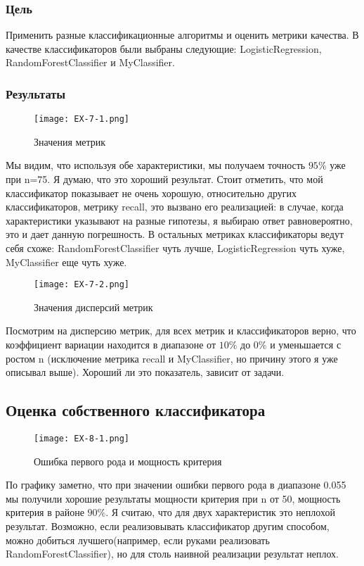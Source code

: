 \documentclass[a4paper, 12pt]{article}
\begin{document}
\subsubsection{Цель}
Применить разные классификационные алгоритмы и оценить метрики качества.
В качестве классификаторов были выбраны следующие: LogisticRegression, RandomForestClassifier и MyClassifier.\\
\subsubsection{Результаты}
\begin{figure}[H]
    \centering
    \texttt{[image: EX-7-1.png]}
    \caption{Значения метрик}
    \label{fig:uml}
\end{figure}
Мы видим, что используя обе характеристики, мы получаем точность $95\%$ уже при n=75. Я думаю, что это хороший результат. Стоит отметить, что мой классификатор показывает не очень хорошую, относительно других классификаторов, метрику recall, это вызвано его реализацией: в случае, когда характеристики указывают на разные гипотезы, я выбираю ответ равновероятно, это и дает данную погрешность. В остальных метриках классификаторы ведут себя схоже: RandomForestClassifier чуть лучше, LogisticRegression чуть хуже, MyClassifier еще чуть хуже.  
\begin{figure}[H]
    \centering
    \texttt{[image: EX-7-2.png]}
    \caption{Значения дисперсий метрик}
    \label{fig:uml}
\end{figure}
Посмотрим на дисперсию метрик, для всех метрик и классификаторов верно, что коэффициент вариации находится в диапазоне от $10\%$ до $0\%$ и уменьшается с ростом n (исключение метрика recall и MyClassifier, но причину этого я уже описывал выше). Хороший ли это показатель, зависит от задачи. 

\subsection{Оценка собственного классификатора}
\begin{figure}[H]
    \centering
    \texttt{[image: EX-8-1.png]}
    \caption{Ошибка первого рода и мощность критерия}
    \label{fig:uml}
\end{figure}

По графику заметно, что при значении ошибки первого рода в диапазоне  0.055 мы получили хорошие результаты мощности критерия при n от 50, мощность критерия в районе $90\%$. Я считаю, что для двух характеристик это неплохой результат. Возможно, если реализовывать классификатор другим способом, можно добиться лучшего(например, если руками реализовать RandomForestClassifier), но для столь наивной реализации результат неплох.\\

\end{document}
